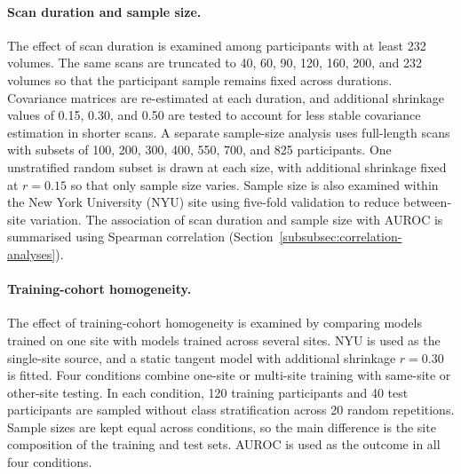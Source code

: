 \paragraph{\textbf{Scan duration and sample size.}}
\label{par:duration-sample-size}
The effect of scan duration is examined among participants with at least 232 volumes. The same scans are truncated to 40, 60, 90, 120, 160, 200, and 232 volumes so that the participant sample remains fixed across durations. Covariance matrices are re-estimated at each duration, and additional shrinkage values of 0.15, 0.30, and 0.50 are tested to account for less stable covariance estimation in shorter scans. A separate sample-size analysis uses full-length scans with subsets of 100, 200, 300, 400, 550, 700, and 825 participants. One unstratified random subset is drawn at each size, with additional shrinkage fixed at $r=0.15$ so that only sample size varies. Sample size is also examined within the New York University (NYU) site using five-fold validation to reduce between-site variation. The association of scan duration and sample size with AUROC is summarised using Spearman correlation (Section~\ref{subsubsec:correlation-analyses}).

\paragraph{\textbf{Training-cohort homogeneity.}}
\label{par:training-homogeneity}
The effect of training-cohort homogeneity is examined by comparing models trained on one site with models trained across several sites. NYU is used as the single-site source, and a static tangent model with additional shrinkage $r=0.30$ is fitted. Four conditions combine one-site or multi-site training with same-site or other-site testing. In each condition, 120 training participants and 40 test participants are sampled without class stratification across 20 random repetitions. Sample sizes are kept equal across conditions, so the main difference is the site composition of the training and test sets. AUROC is used as the outcome in all four conditions.


